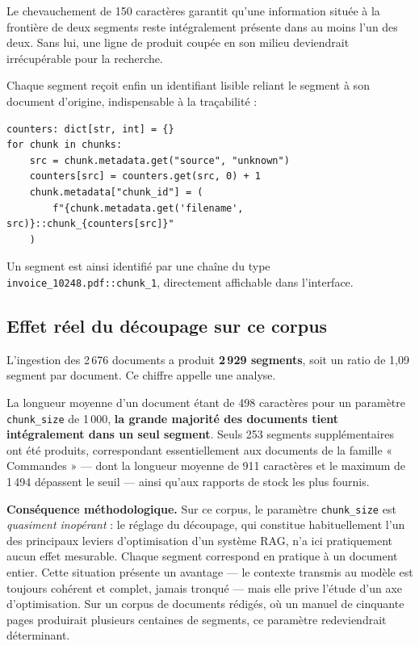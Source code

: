 Le chevauchement de 150 caractères garantit qu'une information située à la
frontière de deux segments reste intégralement présente dans au moins l'un des
deux. Sans lui, une ligne de produit coupée en son milieu deviendrait
irrécupérable pour la recherche.

Chaque segment reçoit enfin un identifiant lisible reliant le segment à son
document d'origine, indispensable à la traçabilité :

\begin{lstlisting}[style=python,caption={Attribution d'un identifiant de segment (\texttt{src/ingestion/chunker.py})}]
counters: dict[str, int] = {}
for chunk in chunks:
    src = chunk.metadata.get("source", "unknown")
    counters[src] = counters.get(src, 0) + 1
    chunk.metadata["chunk_id"] = (
        f"{chunk.metadata.get('filename', src)}::chunk_{counters[src]}"
    )
\end{lstlisting}

Un segment est ainsi identifié par une chaîne du type
\texttt{invoice\_10248.pdf::chunk\_1}, directement affichable dans l'interface.

\subsection{Effet réel du découpage sur ce corpus}

L'ingestion des 2\,676 documents a produit \textbf{2\,929 segments}, soit un
ratio de 1,09 segment par document. Ce chiffre appelle une analyse.

La longueur moyenne d'un document étant de 498 caractères pour un paramètre
\texttt{chunk\_size} de 1\,000, \textbf{la grande majorité des documents tient
intégralement dans un seul segment}. Seuls 253 segments supplémentaires ont été
produits, correspondant essentiellement aux documents de la famille
« Commandes » --- dont la longueur moyenne de 911 caractères et le maximum de
1\,494 dépassent le seuil --- ainsi qu'aux rapports de stock les plus fournis.

\begin{encadre}
\textbf{Conséquence méthodologique.} Sur ce corpus, le paramètre
\texttt{chunk\_size} est \emph{quasiment inopérant} : le réglage du découpage,
qui constitue habituellement l'un des principaux leviers d'optimisation d'un
système RAG, n'a ici pratiquement aucun effet mesurable. Chaque segment
correspond en pratique à un document entier. Cette situation présente un
avantage --- le contexte transmis au modèle est toujours cohérent et complet,
jamais tronqué --- mais elle prive l'étude d'un axe d'optimisation. Sur un corpus
de documents rédigés, où un manuel de cinquante pages produirait plusieurs
centaines de segments, ce paramètre redeviendrait déterminant.
\end{encadre}

